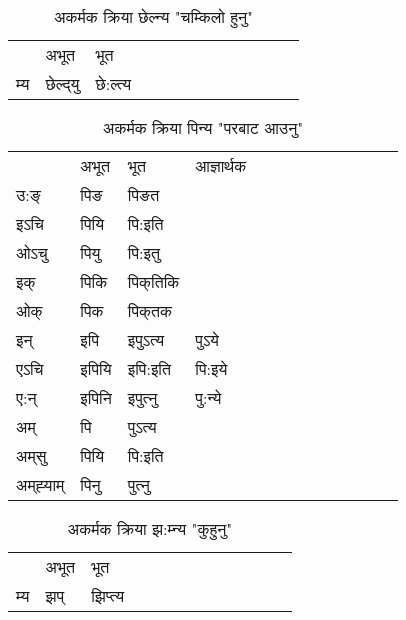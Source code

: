 \begin{table}[H]
\centering
\caption{\label{elt.vt} अकर्मक क्रिया  छेल्न्य  "चम्किलो हुनु"  }
\begin{tabular}{l|l|l|l|l|l|l|l|l|l|l|l|l}  \toprule
&अभूत & भूत   \\ 
म्य & छेल्द्‌यु  & छे:ल्त्य  \\ 
\bottomrule
\end{tabular}
\end{table}


\begin{table}[H]
\centering
\caption{\label{i.vi} अकर्मक क्रिया  पिन्य  "परबाट आउनु"  }
\begin{tabular}{l|l|l|l|l|l|l|l|l|l|l|l|l}  \toprule
&अभूत & भूत & आज्ञार्थक \\ 
उ:ङ्‌ &पिङ &पिङत \\ 
इऽचि &पियि &पि:इति   \\ 
ओऽचु &पियु &पि:इतु   \\ 
इक् &पिकि &पिक्‌तिकि   \\ 
ओक् &पिक &पिक्‌तक   \\ 
इन् & इपि & इपुऽत्य &पुऽये  \\ 
एऽचि & इपियि & इपि:इति &पि:इये    \\ 
ए:न् & इपिनि  & इपुत्‍नु &पु:न्ये  \\ 
अम् & पि & पुऽत्य   \\ 
अम्‌सु & पियि & पि:इति     \\ 
अम्‌ह्‍याम् & पिनु  & पुत्‍नु \\ 
\bottomrule
\end{tabular}
\end{table}


\begin{table}[H]
\centering
\caption{\label{ip.vi} अकर्मक क्रिया  झ:म्‍न्य  "कुहुनु"  }
\begin{tabular}{l|l|l|l|l|l|l|l|l|l|l|l|l}  \toprule
&अभूत & भूत   \\ 
म्य & झप् & झिप्‍त्य   \\ 
\bottomrule
\end{tabular}
\end{table}



